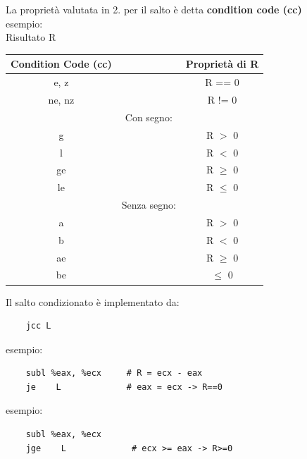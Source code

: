 \noindent La proprietà valutata in 2. per il salto è detta \textbf{condition code (cc)}
\\ esempio: 
\\ Risultato R

\begin{table}[H]
    
    \begin{tabular}{ccc}
        Condition Code (cc) & &Proprietà di R \\
        \hline
         e, z &  &R == 0 \\
         ne, nz &   &R != 0 \\     
        &Con segno: & \\
         g  &   &R $>$ 0\\
         l  &    & R $<$ 0\\
         ge &    & R $\ge$ 0\\
         le &    & R $\le$ 0\\
        &Senza segno: &\\
         a & & R $>$ 0 \\
         b &  &R $<$ 0 \\
         ae &  &R $\ge$ 0 \\
         be &  &  $\le$ 0 \\
         \hline
    \end{tabular}
\end{table}

\noindent Il salto condizionato è implementato da:
\begin{verbatim}
    jcc L
\end{verbatim}
\noindent esempio:
\begin{verbatim}
    subl %eax, %ecx     # R = ecx - eax
    je    L             # eax = ecx -> R==0
\end{verbatim}
\noindent esempio:
\begin{verbatim}
    subl %eax, %ecx     
    jge    L             # ecx >= eax -> R>=0
\end{verbatim}
